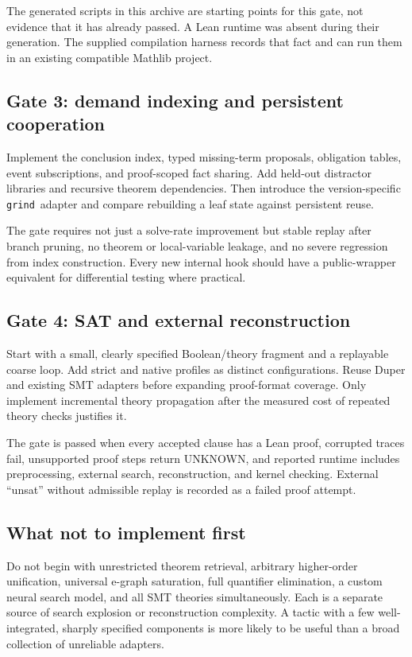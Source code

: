 \documentclass[11pt,a4paper]{article}
\newcommand{\grind}{\texttt{grind}}
\newcommand{\unknown}{\textnormal{UNKNOWN}}
\begin{document}
The generated scripts in this archive are starting points for this gate, not evidence that it has already passed. A Lean runtime was absent during their generation. The supplied compilation harness records that fact and can run them in an existing compatible Mathlib project.

\subsection{Gate 3: demand indexing and persistent cooperation}

Implement the conclusion index, typed missing-term proposals, obligation tables, event subscriptions, and proof-scoped fact sharing. Add held-out distractor libraries and recursive theorem dependencies. Then introduce the version-specific \grind\ adapter and compare rebuilding a leaf state against persistent reuse.

The gate requires not just a solve-rate improvement but stable replay after branch pruning, no theorem or local-variable leakage, and no severe regression from index construction. Every new internal hook should have a public-wrapper equivalent for differential testing where practical.

\subsection{Gate 4: SAT and external reconstruction}

Start with a small, clearly specified Boolean/theory fragment and a replayable coarse loop. Add strict and native profiles as distinct configurations. Reuse Duper and existing SMT adapters before expanding proof-format coverage. Only implement incremental theory propagation after the measured cost of repeated theory checks justifies it.

The gate is passed when every accepted clause has a Lean proof, corrupted traces fail, unsupported proof steps return \unknown, and reported runtime includes preprocessing, external search, reconstruction, and kernel checking. External ``unsat'' without admissible replay is recorded as a failed proof attempt.

\subsection{What not to implement first}

Do not begin with unrestricted theorem retrieval, arbitrary higher-order unification, universal e-graph saturation, full quantifier elimination, a custom neural search model, and all SMT theories simultaneously. Each is a separate source of search explosion or reconstruction complexity. A tactic with a few well-integrated, sharply specified components is more likely to be useful than a broad collection of unreliable adapters.
\end{document}
